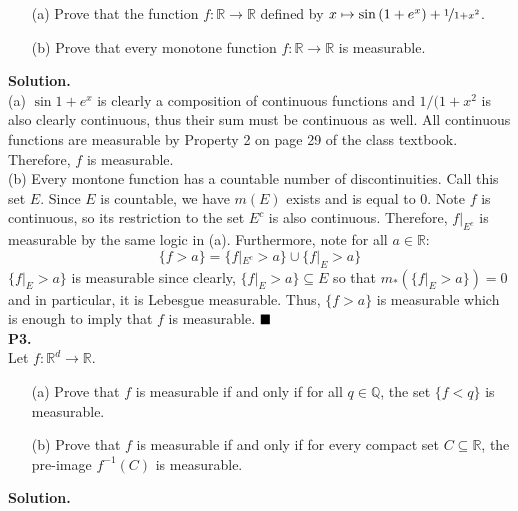 \documentclass{article}
\begin{document}
    \begin{enumerate}
        \item[(a)] Prove that the function $f:\mathbb{R}\to\mathbb{R}$ defined by $x\mapsto\sin{(1+e^x)}+\nicefrac{1}{1+x^2}$.
        \item[(b)] Prove that every monotone function $f:\mathbb{R}\to\mathbb{R}$ is measurable.
    \end{enumerate}

    \textbf{Solution.}\\

    (a) $\sin{1+e^x}$ is clearly a composition of continuous functions and $1/(1+x^2$ is also clearly continuous,
    thus their sum must be continuous as well. All continuous functions are measurable by Property 2 on page 29 of the class
    textbook. Therefore, $f$ is measurable.\\

    (b) Every montone function has a countable number of discontinuities. Call this set $E$. Since $E$ is countable,
    we have $m(E)$ exists and is equal to 0. Note $f$ is continuous, so its restriction to the set $E^c$ is also continuous.
    Therefore, $f|_{E^c}$ is measurable by the same logic in (a). Furthermore, note for all $a\in\mathbb{R}$:
    \[ \{f > a\} = \{f|_{E^c} > a\} \cup \{f|_{E} > a\} \]
    $\{f|_E > a\}$ is measurable since clearly, $\{f|_E > a\} \subseteq E$ so that $m_*(\{f|_E > a\}) = 0$ and in particular,
    it is Lebesgue measurable. Thus, $\{f > a\}$ is measurable which is enough to imply that $f$ is measurable.
    $\hfill\blacksquare$\\

    \textbf{P3.}\\

    Let $f:\mathbb{R}^d\to\mathbb{R}$.
    \begin{enumerate}
        \item[(a)] Prove that $f$ is measurable if and only if for all $q\in\mathbb{Q}$, the set $\{f < q\}$ is measurable.
        \item[(b)] Prove that $f$ is measurable if and only if for every compact set $C\subseteq\mathbb{R}$, the pre-image
            $f^{-1}(C)$ is measurable.
    \end{enumerate}

    \textbf{Solution.}
\end{document}
